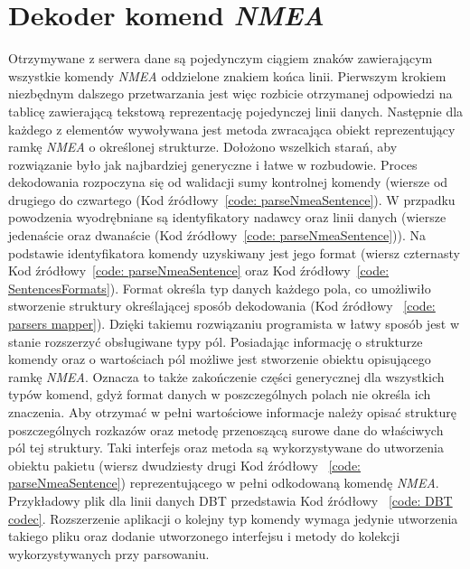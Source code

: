 \documentclass[skorowidz,skroty]{dyplomWEZUT}
\begin{document}
\section{Dekoder komend \textit{NMEA}}\label{sec: NMEA parser}
Otrzymywane z serwera dane są pojedynczym ciągiem znaków zawierającym wszystkie komendy \textit{NMEA} oddzielone znakiem końca linii. Pierwszym krokiem niezbędnym dalszego przetwarzania jest więc rozbicie otrzymanej odpowiedzi na tablicę zawierającą tekstową reprezentację pojedynczej linii danych. Następnie dla każdego z elementów wywoływana jest metoda zwracająca obiekt reprezentujący ramkę \textit{NMEA} o określonej strukturze. Dołożono wszelkich starań, aby rozwiązanie było jak najbardziej generyczne i łatwe w rozbudowie. Proces dekodowania rozpoczyna się od walidacji sumy kontrolnej komendy (wiersze od drugiego do czwartego (Kod źródłowy~\ref{code: parseNmeaSentence}). W przpadku powodzenia wyodrębniane są identyfikatory nadawcy oraz linii danych (wiersze jedenaście oraz dwanaście (Kod źródłowy~\ref{code: parseNmeaSentence})). Na podstawie identyfikatora komendy uzyskiwany jest jego format (wiersz czternasty Kod źródłowy~\ref{code: parseNmeaSentence} oraz Kod źródłowy~\ref{code: SentencesFormats}). Format określa typ danych każdego pola, co umożliwiło stworzenie struktury określającej sposób dekodowania (Kod źródłowy ~\ref{code: parsers mapper}). Dzięki takiemu rozwiązaniu programista w łatwy sposób jest w stanie rozszerzyć obsługiwane typy pól. Posiadając informację o strukturze komendy oraz o wartościach pól możliwe jest stworzenie obiektu opisującego ramkę \textit{NMEA}. Oznacza to także zakończenie części generycznej dla wszystkich typów komend, gdyż format danych w poszczególnych polach nie określa ich znaczenia. Aby otrzymać w pełni wartościowe informacje należy opisać strukturę poszczególnych rozkazów oraz metodę przenoszącą surowe dane do właściwych pól tej struktury. Taki interfejs oraz metoda są wykorzystywane do utworzenia obiektu pakietu (wiersz dwudziesty drugi Kod źródłowy ~\ref{code: parseNmeaSentence}) reprezentującego w pełni odkodowaną komendę \textit{NMEA}. Przykładowy plik dla linii danych DBT przedstawia Kod źródłowy ~\ref{code: DBT codec}. Rozszerzenie aplikacji o kolejny typ komendy wymaga jedynie utworzenia takiego pliku oraz dodanie utworzonego interfejsu i metody do kolekcji wykorzystywanych przy parsowaniu.
\end{document}
